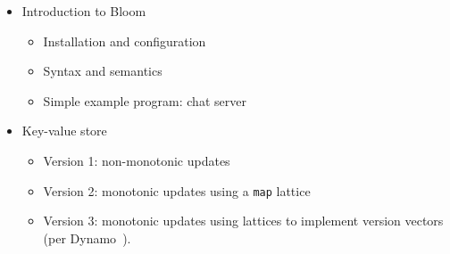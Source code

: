 \documentclass{sig-alternate}
\begin{document}
\begin{itemize}
\item
  Introduction to Bloom
  \begin{itemize}
  \item
    Installation and configuration
  \item
    Syntax and semantics
  \item
    Simple example program: chat server
  \end{itemize}
\item
  Key-value store
  \begin{itemize}
  \item
    Version 1: non-monotonic updates
  \item
    Version 2: monotonic updates using a \texttt{map} lattice
  \item
    Version 3: monotonic updates using lattices to implement version vectors
    (per Dynamo~\cite{DeCandia2007}).
  \end{itemize}
\end{itemize}



\end{document}
